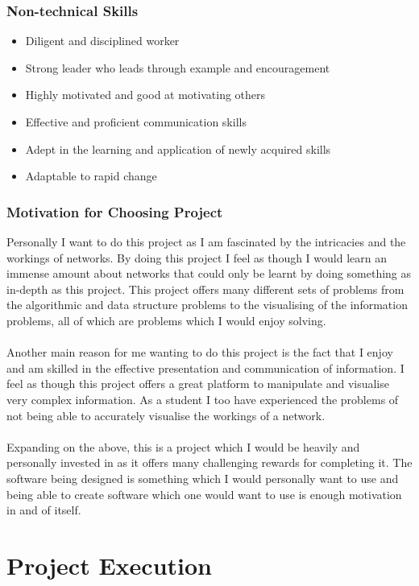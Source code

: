 \documentclass{article}
\begin{document}
	\subsubsection{Non-technical Skills}
		\begin{itemize}
			\item Diligent and disciplined worker
			\item Strong leader who leads through example and encouragement
			\item Highly motivated and good at motivating others
			\item Effective and proficient communication skills
			\item Adept in the learning and application of newly acquired skills
			\item Adaptable to rapid change
		\end{itemize}
	\subsubsection{Motivation for Choosing Project}
		Personally I want to do this project as I am fascinated by the intricacies and the workings of networks. By doing this project I feel as though I would learn an immense amount about networks that could only be learnt by doing something as in-depth as this project. This project offers many different sets of problems from the algorithmic and data structure problems to the visualising of the information problems, all of which are problems which I would enjoy solving.
\\\\		
		Another main reason for me wanting to do this project is the fact that I enjoy and am skilled in the effective presentation and communication of information. I feel as though this project offers a great platform to manipulate and visualise very complex information. As a student I too have experienced the problems of not being able to accurately visualise the workings of a network.
\\\\		
		Expanding on the above, this is a project which I would be heavily and personally invested in as it offers many challenging rewards for completing it. The software being designed is something which I would personally want to use and being able to create software which one would want to use is enough motivation in and of itself.

\cleardoublepage
    
\section{Project Execution}
\end{document}
